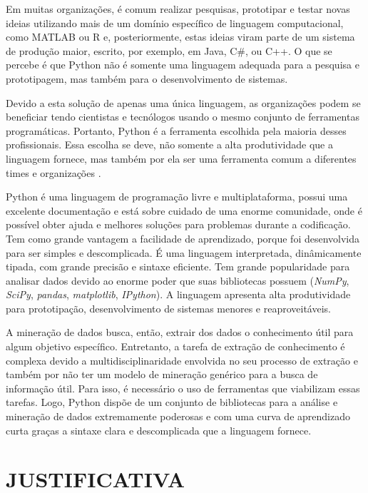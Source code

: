 Em muitas organizações, é comum realizar pesquisas, prototipar e testar novas ideias utilizando mais de um domínio específico de linguagem computacional, como MATLAB ou R e, posteriormente, estas ideias viram parte de um sistema de produção maior, escrito, por exemplo, em Java, C\#, ou C++. O que se percebe é que Python não é somente uma linguagem adequada para a pesquisa e prototipagem, mas também para o desenvolvimento de sistemas.

Devido a esta solução de apenas uma única linguagem, as organizações podem se beneficiar tendo cientistas e tecnólogos usando o mesmo conjunto de ferramentas programáticas. Portanto, Python é a ferramenta escolhida pela maioria desses profissionais. Essa escolha se deve, não somente a alta produtividade que a linguagem fornece, mas também por ela ser uma ferramenta comum a diferentes times e organizações \cite{kaldero}. 

Python é uma linguagem de programação livre e multiplataforma, possui uma excelente documentação e está sobre cuidado de uma enorme comunidade, onde é possível obter ajuda e melhores soluções para problemas durante a codificação. Tem como grande vantagem a facilidade de aprendizado, porque foi desenvolvida para ser simples e descomplicada. É uma linguagem interpretada, dinâmicamente tipada, com grande precisão e sintaxe eficiente. Tem grande popularidade para analisar dados devido ao enorme poder que suas bibliotecas possuem (\textit{NumPy}, \textit{SciPy}, \textit{pandas}, \textit{matplotlib}, \textit{IPython}). A linguagem apresenta alta produtividade para prototipação, desenvolvimento de sistemas menores e reaproveitáveis.

A mineração de dados busca, então, extrair dos dados o conhecimento útil para algum objetivo específico. Entretanto, a tarefa de extração de conhecimento é complexa devido a multidisciplinaridade envolvida no seu processo de extração e também por não ter um modelo de mineração genérico para a busca de informação útil. Para isso, é necessário o uso de ferramentas que viabilizam essas tarefas. Logo, Python dispõe de um conjunto de bibliotecas para a análise e mineração de dados extremamente poderosas e com uma curva de aprendizado curta graças a sintaxe clara e descomplicada que a linguagem fornece.


\section{JUSTIFICATIVA}\label{sec:justificativa}

